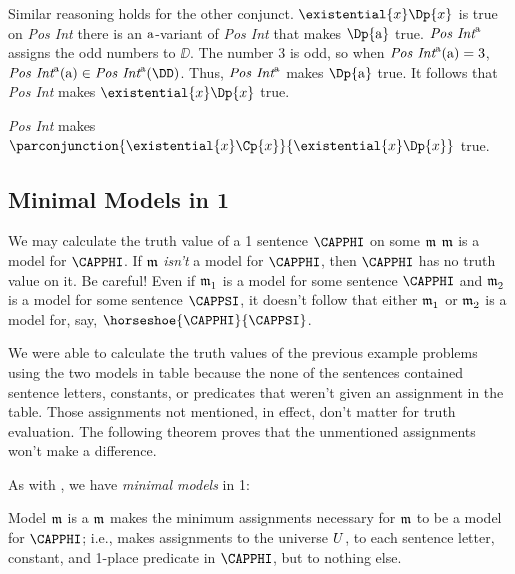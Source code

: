 \begin{PROOF}
Similar reasoning holds for the other conjunct.  $\existential{\variable{x}}\Dp{\variable{x}}$ is true on \emph{Pos Int} \Iff there is an $\mathrm{a}$-variant of \emph{Pos Int} that makes $\Dp{\constant{a}}$ true.  $\emph{Pos Int}^{\mathrm{a}}$ assigns the odd numbers to $\DD$.  The number $3$ is odd, so when $\emph{Pos Int}^{\mathrm{a}}(\mathrm{a})=3$, $\emph{Pos Int}^{\constant{a}}(\constant{a})\in\emph{Pos Int}^{\constant{a}}(\DD)$.  Thus, $\emph{Pos Int}^{\mathrm{a}}$ makes $\Dp{\constant{a}}$ true. It follows that \emph{Pos Int} makes $\existential{\variable{x}}\Dp{\variable{x}}$ true.
	
\emph{Pos Int} makes $\parconjunction{\existential{\variable{x}}\Cp{\variable{x}}}{\existential{\variable{x}}\Dp{\variable{x}}}$ true.
\end{PROOF}	

\subsection{Minimal Models in \GQL{}1}\label{Minimal Models in GQL1}

We may calculate the truth value of a \GQL{}1 sentence $\CAPPHI$ on some $\mathfrak{m}$ \Iff $\mathfrak{m}$ is a model for $\CAPPHI$.  If $\mathfrak{m}$ \emph{isn't} a model for $\CAPPHI$, then $\CAPPHI$ has no truth value on it.  Be careful!  Even if $\mathfrak{m^{\mathrm{}}_{\mathrm{1}}}$ is a model for some sentence $\CAPPHI$ and $\mathfrak{m^{\mathrm{}}_{\mathrm{2}}}$ is a model for some sentence $\CAPPSI$, it doesn't follow that either $\mathfrak{m^{\mathrm{}}_{\mathrm{1}}}$ or $\mathfrak{m^{\mathrm{}}_{\mathrm{2}}}$ is a model for, say, $\horseshoe{\CAPPHI}{\CAPPSI}$.

We were able to calculate the truth values of the previous example problems using the two models in table  because the none of the sentences contained sentence letters, constants, or predicates that weren't given an assignment in the table.  Those assignments not mentioned, in effect, don't matter for truth evaluation.  The following theorem proves that the unmentioned assignments won't make a difference.

As with \GSL{}, we have \emph{minimal models} in \GQL{}1:

\begin{majorILnc}{}
	Model $\mathfrak{m}$ is a  \Iff $\mathfrak{m}$ makes the minimum assignments necessary for $\mathfrak{m}$ to be a model for $\CAPPHI$; i.e., makes assignments to the universe $U$, to each sentence letter, constant, and 1-place predicate in $\CAPPHI$, but to nothing else.
\end{majorILnc}


